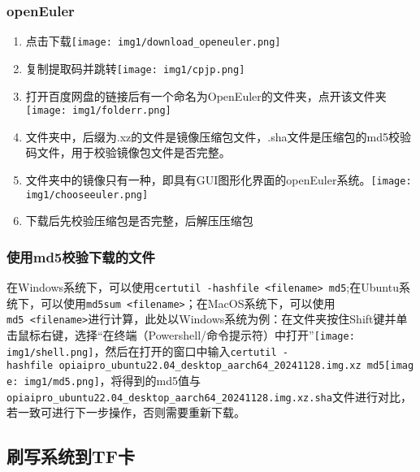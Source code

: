 \hypertarget{openeuler}{%
\subsubsection{openEuler}\label{openeuler}}

\begin{enumerate}
\def\labelenumi{\arabic{enumi}.}
\tightlist
\item
  点击下载\texttt{[image: img1/download\_openeuler.png]}
\item
  复制提取码并跳转\texttt{[image: img1/cpjp.png]}
\item
  打开百度网盘的链接后有一个命名为OpenEuler的文件夹，点开该文件夹\texttt{[image: img1/folderr.png]}
\item
  文件夹中，后缀为.xz的文件是镜像压缩包文件，.sha文件是压缩包的md5校验码文件，用于校验镜像包文件是否完整。
\item
  文件夹中的镜像只有一种，即具有GUI图形化界面的openEuler系统。\texttt{[image: img1/chooseeuler.png]}
\item
  下载后先校验压缩包是否完整，后解压压缩包
\end{enumerate}

\hypertarget{ux4f7fux7528md5ux6821ux9a8cux4e0bux8f7dux7684ux6587ux4ef6}{%
\subsubsection{使用md5校验下载的文件}\label{ux4f7fux7528md5ux6821ux9a8cux4e0bux8f7dux7684ux6587ux4ef6}}

在Windows系统下，可以使用\texttt{certutil\ -hashfile\ \textless{}filename\textgreater{}\ md5};在Ubuntu系统下，可以使用\texttt{md5sum\ \textless{}filename\textgreater{}}；在MacOS系统下，可以使用\texttt{md5\ \textless{}filename\textgreater{}}进行计算，此处以Windows系统为例：在文件夹按住Shift键并单击鼠标右键，选择``在终端（Powershell/命令提示符）中打开''\texttt{[image: img1/shell.png]}，然后在打开的窗口中输入\texttt{certutil\ -hashfile\ opiaipro\_ubuntu22.04\_desktop\_aarch64\_20241128.img.xz\ md5}\texttt{[image: img1/md5.png]}，将得到的md5值与\texttt{opiaipro\_ubuntu22.04\_desktop\_aarch64\_20241128.img.xz.sha}文件进行对比，若一致可进行下一步操作，否则需要重新下载。

\hypertarget{ux5237ux5199ux7cfbux7edfux5230tfux5361}{%
\subsection{刷写系统到TF卡}\label{ux5237ux5199ux7cfbux7edfux5230tfux5361}}

